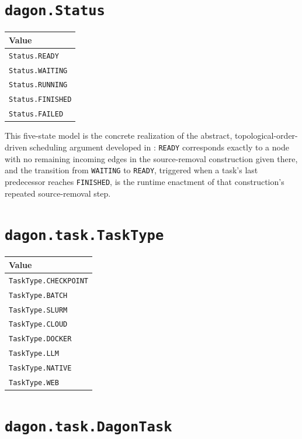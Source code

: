 \section{\texttt{dagon.Status}}

\begin{center}
\begin{tabular}{@{}l@{}}
\toprule
\textbf{Value} \\
\midrule
\texttt{Status.READY} \\
\texttt{Status.WAITING} \\
\texttt{Status.RUNNING} \\
\texttt{Status.FINISHED} \\
\texttt{Status.FAILED} \\
\bottomrule
\end{tabular}
\end{center}

This five-state model is the concrete realization of the abstract,
topological-order-driven scheduling argument developed in
: \texttt{READY} corresponds exactly to a
node with no remaining incoming edges in the source-removal construction
given there, and the transition from \texttt{WAITING} to \texttt{READY},
triggered when a task's last predecessor reaches \texttt{FINISHED}, is the
runtime enactment of that construction's repeated source-removal step.

\section{\texttt{dagon.task.TaskType}}

\begin{center}
\begin{tabular}{@{}l@{}}
\toprule
\textbf{Value} \\
\midrule
\texttt{TaskType.CHECKPOINT} \\
\texttt{TaskType.BATCH} \\
\texttt{TaskType.SLURM} \\
\texttt{TaskType.CLOUD} \\
\texttt{TaskType.DOCKER} \\
\texttt{TaskType.LLM} \\
\texttt{TaskType.NATIVE} \\
\texttt{TaskType.WEB} \\
\bottomrule
\end{tabular}
\end{center}

\section{\texttt{dagon.task.DagonTask}}

